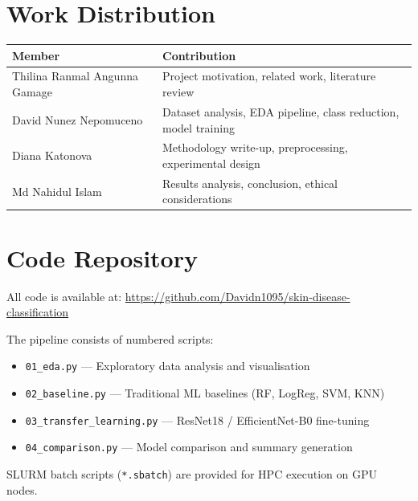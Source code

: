 \documentclass[11pt,a4paper]{article}
\begin{document}
\section{Work Distribution}
\label{app:work}

\begin{table}[H]
\centering
\begin{tabular}{ll}
\toprule
\textbf{Member} & \textbf{Contribution} \\
\midrule
Thilina Ranmal Angunna Gamage  & Project motivation, related work, literature review \\
David Nunez Nepomuceno         & Dataset analysis, EDA pipeline, class reduction, model training \\
Diana Katonova                 & Methodology write-up, preprocessing, experimental design \\
Md Nahidul Islam               & Results analysis, conclusion, ethical considerations \\
\bottomrule
\end{tabular}
\end{table}

\section{Code Repository}
\label{app:code}

All code is available at: \url{https://github.com/Davidn1095/skin-disease-classification}

The pipeline consists of numbered scripts:
\begin{itemize}[nosep]
  \item \texttt{01\_eda.py} --- Exploratory data analysis and visualisation
  \item \texttt{02\_baseline.py} --- Traditional ML baselines (RF, LogReg, SVM, KNN)
  \item \texttt{03\_transfer\_learning.py} --- ResNet18 / EfficientNet-B0 fine-tuning
  \item \texttt{04\_comparison.py} --- Model comparison and summary generation
\end{itemize}

SLURM batch scripts (\texttt{*.sbatch}) are provided for HPC execution on GPU nodes.

% 
% 
\end{document}
